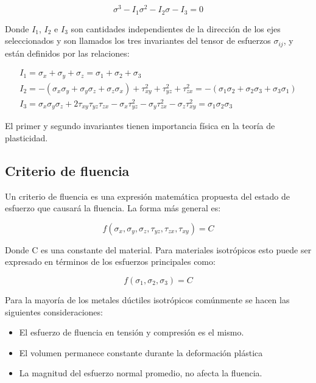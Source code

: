 \begin{equation}
\sigma^3 - I_1 \sigma^2 - I_2 \sigma - I_3 = 0
\end{equation}

Donde $I_1$, $I_2$ e $I_3$ son cantidades independientes de la dirección de los ejes 
seleccionados y son llamados los tres invariantes del tensor de esfuerzos $\sigma_{ij}$, y están definidos 
por las relaciones:

\begin{align}
I_1 = \sigma_x + \sigma_y + \sigma_z = \sigma_1 + \sigma_2 + \sigma_3 \\
I_2 = -\left( \sigma_x \sigma_y + \sigma_y \sigma_z + \sigma_z \sigma_x \right) + \tau_{xy}^2 + 
\tau_{yz}^2 + \tau_{zx}^2 = -(\sigma_1 \sigma_2 + \sigma_2 \sigma_3 + \sigma_3 \sigma_1) \\
I_3 = \sigma_x \sigma_y \sigma_z + 2 \tau_{xy} \tau_{yz} \tau_{zx} - \sigma_x \tau_{yz}^2 - \sigma_y \tau_{zx}^2 - 
\sigma_z \tau_{xy}^2 = \sigma_1 \sigma_2 \sigma_3
\end{align}

El primer y segundo invariantes tienen importancia física en la teoría de plasticidad.


\subsection{Criterio de fluencia}

Un criterio de fluencia es una expresión matemática propuesta del estado de esfuerzo que causará 
la fluencia. La forma más general es: ~\cite{hosford2005}

\begin{equation}
f(\sigma_x,\sigma_y, \sigma_z, \tau_{yz}, \tau_{zx}, \tau_{xy} ) = C 
\end{equation}

Donde C es una constante del material. Para materiales isotrópicos esto puede ser expresado en 
términos de los esfuerzos principales como: ~\cite{hosford2005}

\begin{equation}
f(\sigma_1,\sigma_2,\sigma_3 )=C
\end{equation}

Para la mayoría de los metales dúctiles isotrópicos comúnmente se hacen las siguientes 
consideraciones: ~\cite{hosford2007}


\begin{itemize}
\item El esfuerzo de fluencia en tensión y compresión es el mismo.
\item El volumen permanece constante durante la deformación plástica
\item La magnitud del esfuerzo normal promedio, no afecta la fluencia.
\end{itemize}

